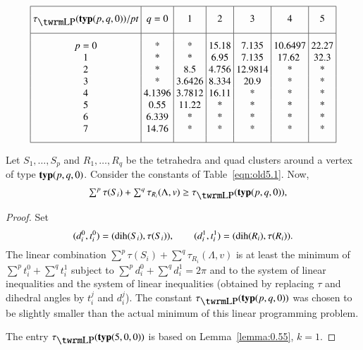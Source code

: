 \begin{equation}
\vbox{\offinterlineskip \hrule
\halign{&\vrule#&\strut\ \hfil#\hfil\ \cr   %
height 7pt&\omit&&\omit&&\omit&&\omit&&\omit&&\omit&&\omit&\cr
&\hfil $\tlp(\pqr{(p,q,0)})/\pt$\hfil
        &&\hfil $q=0$\hfil
        &&\hfil1\hfil
        &&\hfil2\hfil
        &&\hfil3\hfil
        &&\hfil4\hfil
        &&\hfil5\hfil&
\cr height 7pt&\omit&&\omit&&\omit&&\omit&&\omit&&\omit&&\omit&\cr
\noalign{\hrule}
height7pt&\omit&&\omit&&\omit&&\omit&&\omit&&\omit&&\omit&\cr
&$p=0$&& *&& *&& 15.18&& 7.135&& 10.6497&& 22.27&\cr &1&&    *&&
*&&  6.95&& 7.135&&17.62  && 32.3&\cr &2&&    *&&
8.5&&4.756&&12.9814&&*&&*&\cr &3&& *&&
3.6426&&8.334&&20.9&&*&&*&\cr
&4&&4.1396&&3.7812&&16.11&&*&&*&&*&\cr
&5&&0.55&&11.22&&*&&*&&*&&*&\cr &6&&6.339&&*&&*&&*&&*&&*&\cr
&7&&14.76&&*&&*&&*&&*&&*&\cr
height7pt&\omit&&\omit&&\omit&&\omit&&\omit&&\omit&&\omit&\cr}
\hrule }
    \label{eqn:old5.1}
\end{equation}



\begin{lemma}
    \label{lemma:pq}
Let $S_1,\ldots,S_p$ and $R_1,\ldots,R_q$ be the tetrahedra and quad
clusters around a vertex of type ${\operatorname{\bf typ}}{(p,q,0)}$. Consider the constants of
Table~\ref{eqn:old5.1}.               Now,
    $$
    \begin{array}{lll}
    &\sum^p\tau(S_i) + \sum^q\tau_{R_i}(\Lambda,v) \ge \tlp(\pqr{(p,q,0)}),\\
    \end{array}
    $$
\end{lemma}

\begin{proof} Set
    $$
    (d_i^0,t_i^0)=(\operatorname{dih}(S_i),\tau(S_i)),\qquad
    (d_i^1,t_i^1)=(\operatorname{dih}(R_i),\tau(R_i)).
    $$
The linear combination $\sum^p\tau(S_i)+\sum^q\tau_{R_i}(\Lambda,v)$ is at
least the minimum of $\sum^p t_i^0+\sum^q t_i^1$ subject to
$\sum^p d_i^0+\sum^q d_i^1 = 2\pi$ and to the system of linear
inequalities  and the system of linear
inequalities  (obtained by replacing $\tau$ and
dihedral angles by $t_i^j$ and $d_i^j$). The constant $\tlp(\pqr{(p,q,0)})$
was chosen to be slightly smaller than the actual minimum of this
linear programming problem.

The entry $\tlp(\pqr{(5,0,0)})$ is based on Lemma~\ref{lemma:0.55}, $k=1$.
\end{proof}

